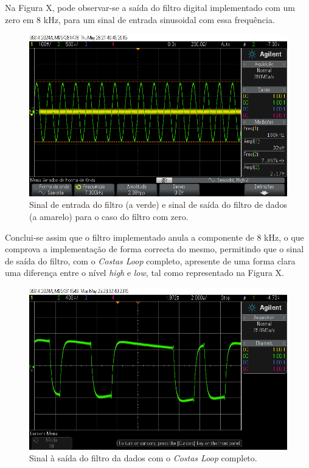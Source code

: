 \documentclass[11pt]{article}
\numberwithin{equation}{section}
\begin{document}
Na Figura X, pode observar-se a saída do filtro digital implementado com um zero em 8 kHz, para um sinal de entrada sinusoidal com essa frequência. 

\begin{figure}[H]
	\centering
	\includegraphics[keepaspectratio=true, scale=0.37]{exps/FiltroComZero8k}
	\caption{Sinal de entrada do filtro (a verde) e sinal de saída do filtro de dados (a amarelo) para o caso do filtro com zero.}
	\vspace{-0.8em}
\end{figure} 

Conclui-se assim que o filtro implementado anula a componente de 8 kHz, o que comprova a implementação de forma correcta do mesmo, permitindo que o sinal de saída do filtro, com o \textit{Costas Loop} completo, apresente de uma forma clara uma diferença entre o nível \textit{high} e \textit{low}, tal como representado na Figura X.

\begin{figure}[H]
	\centering
	\includegraphics[keepaspectratio=true, scale=0.37]{exps/pulse_saida_filtro_Sine_mudancanoFiltro}
	\caption{Sinal à saída do filtro da dados com o \textit{Costas Loop} completo.}
	\vspace{-0.8em}
\end{figure}
\end{document}
